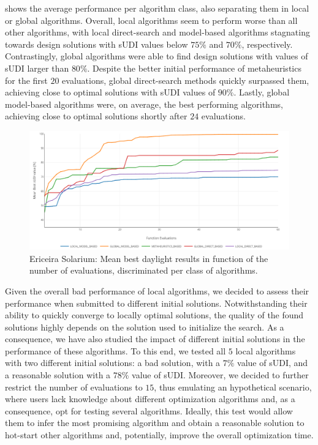  shows the average performance per algorithm class, also separating them in local or global algorithms. Overall, local algorithms seem to perform worse than all other algorithms, with local direct-search and model-based algorithms stagnating towards design solutions with \ac{sUDI} values below $75\%$ and $70\%$, respectively. Contrastingly, global algorithms were able to find design solutions with values of \ac{sUDI} larger than $80\%$. Despite the better initial performance of metaheuristics for the first $20$ evaluations, global direct-search methods quickly surpassed them, achieving close to optimal solutions with \ac{sUDI} values of $90\%$. Lastly, global model-based algorithms were, on average, the best performing algorithms, achieving close to optimal solutions shortly after $24$ evaluations. 

\begin{figure}[htbp]
	\centering
	\includegraphics[width=1\textwidth]{Images/Evaluation/Ericeira_results_ph1_per_class.PNG}
	\caption[Ericeira Solarium: Mean best daylight results in function of the number of evaluations, discriminated per class of algorithms]{Ericeira Solarium: Mean best daylight results in function of the number of evaluations, discriminated per class of algorithms.}
	\label{fig:phase1results}
\end{figure}

Given the overall bad performance of local algorithms, we decided to assess their performance when submitted to different initial solutions. Notwithstanding their ability to quickly converge to locally optimal solutions, the quality of the found solutions highly depends on the solution used to initialize the search. As a consequence, we have also studied the impact of different initial solutions in the performance of these algorithms. To this end, we tested all $5$ local algorithms with two different initial solutions: a bad solution, with a $7\%$ value of \ac{sUDI}, and a reasonable solution with a $78\%$ value of \ac{sUDI}. Moreover, we decided to further restrict the number of evaluations to $15$, thus emulating an hypothetical scenario, where users lack knowledge about different optimization algorithms and, as a consequence, opt for testing several algorithms. Ideally, this test would allow them to infer the most promising algorithm and obtain a reasonable solution to hot-start other algorithms and, potentially, improve the overall optimization time.

